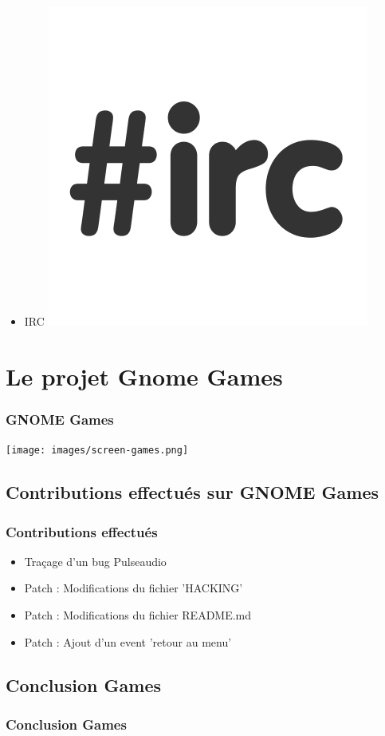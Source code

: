 \documentclass{beamer}
\begin{document}
\begin{frame}
\begin{itemize}
  \item IRC
    \includegraphics[scale=0.07]{images/irc-logo.png}
  \end{itemize}
\end{frame}


\section{Le projet Gnome Games}
\begin{frame}
  \frametitle{GNOME Games}
  \texttt{[image: images/screen-games.png]}
\end{frame}

\subsection{Contributions effectués sur GNOME Games}
\begin{frame}
  \frametitle{Contributions effectués}
  \begin{itemize}
    \item Traçage d'un bug Pulseaudio
    \item Patch : Modifications du fichier 'HACKING'
    \item Patch : Modifications du fichier README.md
    \item Patch : Ajout d'un event 'retour au menu'
  \end{itemize}
\end{frame}

\subsection{Conclusion Games}
\begin{frame}
  \frametitle{Conclusion Games}
\end{frame}
\end{document}
